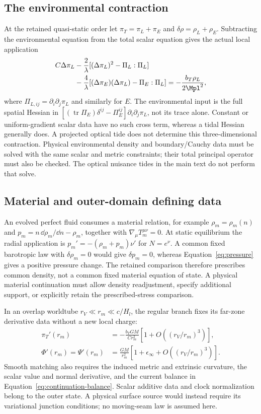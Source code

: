 \subsection{The environmental contraction}
At the retained quasi-static order let $\pi_T=\pi_L+\pi_E$ and
$\delta\rho=\rho_L+\rho_E$. Subtracting the environmental equation from
the total scalar equation gives the actual local application
\begin{align}
 C\Delta\pi_L
 &-\frac2\lambda[(\Delta\pi_L)^2-\Pi_L:\Pi_L]\nonumber\\
 &-\frac4\lambda[(\Delta\pi_E)(\Delta\pi_L)-\Pi_E:\Pi_L]
   =-\frac{b_T\rho_L}{2\Mpl^2},
 \label{eq:continuation-environment}
\end{align}
where $\Pi_{L,ij}=\partial_i\partial_j\pi_L$ and similarly for $E$.
The environmental input is the full spatial Hessian in
$[(\operatorname{tr}\Pi_E)\delta^{ij}-\Pi_E^{ij}]
\partial_i\partial_j\pi_L$, not its trace alone. Constant or
uniform-gradient scalar data have no such cross term, whereas a tidal
Hessian generally does. A projected optical tide does not determine this
three-dimensional contraction. Physical environmental density and
boundary/Cauchy data must be solved with the same scalar and metric
constraints; their total principal operator must also be checked.
The optical nuisance tides in the main text do not perform that solve.

\subsection{Material and outer-domain defining data}
An evolved perfect fluid consumes a material relation, for example
$\rho_m=\rho_m(n)$ and $p_m=n\,\dd\rho_m/\dd n-\rho_m$, together with
$\nabla_\mu T_m^{\mu\nu}=0$. At static equilibrium the radial application
is $p_m'=-(\rho_m+p_m)\nu'$ for $N=e^\nu$.
A common fixed barotropic law with $\delta\rho_m=0$ would give
$\delta p_m=0$, whereas Equation~\eqref{eq:pressure} gives a positive
pressure change. The retained comparison therefore prescribes common
density, not a common fixed material equation of state. A physical
material continuation must allow density readjustment, specify additional
support, or explicitly retain the prescribed-stress comparison.

In an overlap worldtube $r_V\ll r_m\ll c/H_l$, the regular branch fixes
its far-zone derivative data without a new local charge:
\begin{align}
 \pi_T'(r_m)&=-\frac{b_TGM}{Cr_m^2}
       [1+O((r_V/r_m)^3)],\nonumber\\
 \Phi'(r_m)=\Psi'(r_m)&=\frac{GM}{r_m^2}
       [1+\epsilon_\infty+O((r_V/r_m)^3)].
 \label{eq:continuation-overlap}
\end{align}
Smooth matching also requires the induced metric and extrinsic curvature,
the scalar value and normal derivative, and the current balance in
Equation~\eqref{eq:continuation-balance}. Scalar additive data and clock
normalization belong to the outer state. A physical surface source would
instead require its variational junction conditions; no moving-seam law
is assumed here.


